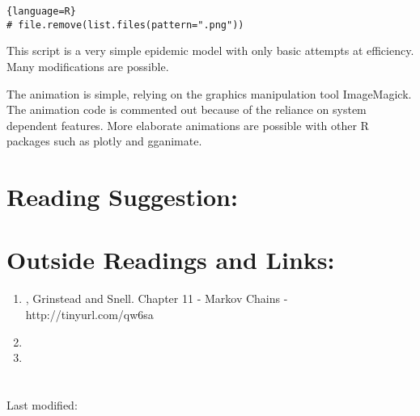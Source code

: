\documentclass[12pt]{article}
\begin{document}
\begin{solution}
\begin{lstlisting}{language=R}
# file.remove(list.files(pattern=".png"))
\end{lstlisting}

    This script is a very simple epidemic model with only basic attempts
    at efficiency.  Many modifications are possible.

    The animation is simple, relying on the graphics manipulation tool
    ImageMagick.  The animation code is commented out because of the
    reliance on system dependent features.  More elaborate animations
    are possible with other R packages such as plotly and gganimate.

\end{solution}
\hr

\section*{Reading Suggestion:}



\hr

\section*{Outside Readings and Links:}
\begin{enumerate}
    \item
        , Grinstead and Snell.
        Chapter 11 - Markov Chains - \\
        http://tinyurl.com/qw6sa
    \item
    \item
\end{enumerate}

\section*{\solutionsname}
\loadSolutions

\hr

\mydisclaim \myfooter

Last modified:  \flastmod
\end{document}
